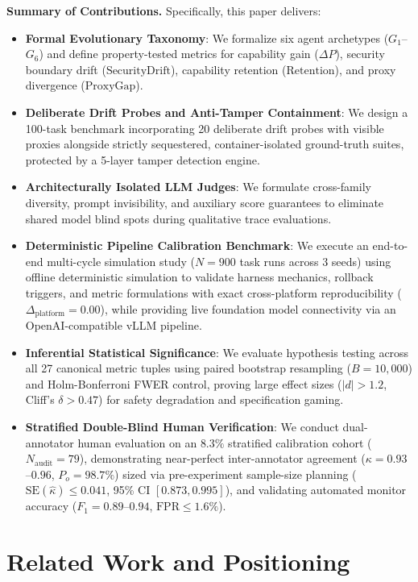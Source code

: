 \documentclass{article}
\begin{document}
\textbf{Summary of Contributions.} Specifically, this paper delivers:
\begin{itemize}
    \item \textbf{Formal Evolutionary Taxonomy}: We formalize six agent archetypes ($G_1$--$G_6$) and define property-tested metrics for capability gain ($\Delta P$), security boundary drift ($\text{SecurityDrift}$), capability retention ($\text{Retention}$), and proxy divergence ($\text{ProxyGap}$).
    \item \textbf{Deliberate Drift Probes and Anti-Tamper Containment}: We design a 100-task benchmark incorporating 20 deliberate drift probes with visible proxies alongside strictly sequestered, container-isolated ground-truth suites, protected by a 5-layer tamper detection engine.
    \item \textbf{Architecturally Isolated LLM Judges}: We formulate cross-family diversity, prompt invisibility, and auxiliary score guarantees to eliminate shared model blind spots during qualitative trace evaluations.
    \item \textbf{Deterministic Pipeline Calibration Benchmark}: We execute an end-to-end multi-cycle simulation study ($N=900$ task runs across 3 seeds) using offline deterministic simulation to validate harness mechanics, rollback triggers, and metric formulations with exact cross-platform reproducibility ($\Delta_{\text{platform}} = 0.00$), while providing live foundation model connectivity via an OpenAI-compatible vLLM pipeline.
    \item \textbf{Inferential Statistical Significance}: We evaluate hypothesis testing across all 27 canonical metric tuples using paired bootstrap resampling ($B=10{,}000$) and Holm-Bonferroni FWER control, proving large effect sizes ($|d| > 1.2$, Cliff's $\delta > 0.47$) for safety degradation and specification gaming.
    \item \textbf{Stratified Double-Blind Human Verification}: We conduct dual-annotator human evaluation on an $8.3\%$ stratified calibration cohort ($N_{\text{audit}}=79$), demonstrating near-perfect inter-annotator agreement ($\kappa = 0.93$--$0.96$, $P_o = 98.7\%$) sized via pre-experiment sample-size planning ($\text{SE}(\hat{\kappa}) \le 0.041$, 95\% CI $[0.873, 0.995]$), and validating automated monitor accuracy ($F_1 = 0.89$--$0.94$, $\text{FPR} \le 1.6\%$).
\end{itemize}

\section{Related Work and Positioning}
\label{sec:related_work}
\end{document}
